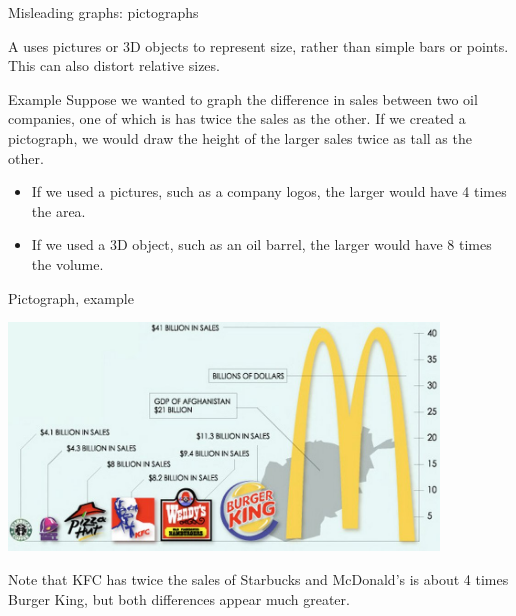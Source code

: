\documentclass[]{beamer}
\begin{document}
\begin{frame}{Misleading graphs: pictographs}
\begin{block}{}
A  uses pictures or 3D objects to represent size, rather than simple bars or points. This can also distort relative sizes.
\end{block}

\pause
\begin{exampleblock}{Example}
Suppose we wanted to graph the difference in sales between two oil companies, one of which is has twice the sales as the other. If we created a pictograph, we would draw the height of the larger sales twice as tall as the other.
\begin{itemize}
\item If we used a pictures, such as a company logos, the larger would have 4 times the area.
\item If we used a 3D object, such as an oil barrel, the larger would have 8 times the volume. 
\end{itemize}
\end{exampleblock}
\end{frame}

\begin{frame}{Pictograph, example}
\begin{center}
\includegraphics[width=4.5in]{../images/ch02_fastfood_pictograph}
\end{center}
\begin{block}{}
Note that KFC has twice the sales of Starbucks and McDonald's is about 4 times Burger King, but both differences appear much greater.
\end{block}
\end{frame}
\end{document}
